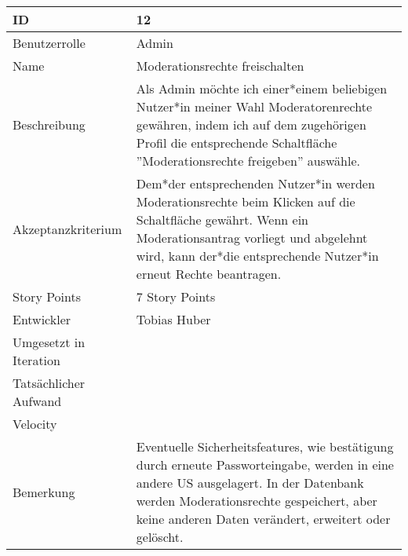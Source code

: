 \begin{tabularx}{\textwidth}{|p{}|X|}
	\hline
	ID & 12\\
	\hline
	Benutzerrolle & Admin\\
	\hline
	Name & Moderationsrechte freischalten\\
	\hline
	Beschreibung & Als Admin möchte ich einer*einem beliebigen Nutzer*in meiner Wahl Moderatorenrechte gewähren, indem ich auf dem zugehörigen Profil die entsprechende Schaltfläche ''Moderationsrechte freigeben'' auswähle.\\
	\hline
	Akzeptanzkriterium & Dem*der entsprechenden Nutzer*in werden Moderationsrechte beim Klicken auf die Schaltfläche gewährt. Wenn ein Moderationsantrag vorliegt und abgelehnt wird, kann der*die entsprechende Nutzer*in erneut Rechte beantragen.\\
	\hline
	Story Points & 7 Story Points\\
	\hline
	Entwickler & Tobias Huber\\
	\hline
	Umgesetzt in Iteration & \\
	\hline
	Tatsächlicher Aufwand & \\
	\hline
	Velocity & \\
	\hline
	Bemerkung & Eventuelle Sicherheitsfeatures, wie bestätigung durch erneute Passworteingabe, werden in eine andere US ausgelagert. In der Datenbank werden Moderationsrechte gespeichert, aber keine anderen Daten verändert, erweitert oder gelöscht.\\
	\hline
\end{tabularx}
\vspace{20pt}
